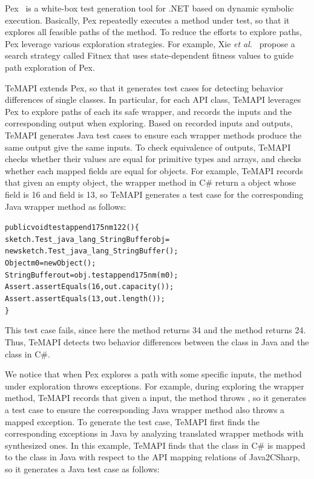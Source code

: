 Pex~\cite{tillmann2008pex} is a white-box test generation tool for .NET based on dynamic symbolic execution. Basically, Pex repeatedly executes a method under test, so that it explores all feasible paths of the method. To reduce the efforts to explore paths, Pex leverage various exploration strategies. For example, Xie \emph{et al.}~\cite{xie09:fitness} propose a search strategy called Fitnex that uses state-dependent fitness values to guide path exploration of Pex.

TeMAPI extends Pex, so that it generates test cases for detecting behavior differences of single classes. In particular, for each API class, TeMAPI leverages Pex to explore paths of each its safe wrapper, and records the inputs and the corresponding output when exploring. Based on recorded inputs and outputs, TeMAPI generates Java test cases to ensure each wrapper methods produce the same output give the same inputs. To check equivalence of  outputs, TeMAPI checks whether their values are equal for primitive types and arrays, and checks whether each mapped fields are equal for objects. For example, TeMAPI records that given an empty object, the  wrapper method in C\# return a  object whose  field is 16 and  field is 13, so TeMAPI generates a test case for the corresponding Java wrapper method as follows:

\begin{CodeOut}\vspace*{-1ex}
\begin{alltt}
public void testappend175nm122()\{
  sketch.Test_java_lang_StringBuffer obj =
      new sketch.Test_java_lang_StringBuffer();
  Object m0 = new Object();
  StringBuffer out = obj.testappend175nm(m0);
  Assert.assertEquals(16, out.capacity());	
  Assert.assertEquals(13, out.length());
\}
\end{alltt}
\end{CodeOut}\vspace*{-2ex}

This test case fails, since here the  method returns 34 and the  method returns 24. Thus, TeMAPI detects two behavior differences between the  class in Java and the  class in C\#.


We notice that when Pex explores a path with some specific inputs, the method under exploration throws exceptions.
For example, during exploring the  wrapper method, TeMAPI records that given a  input, the method throws , so it generates a test case to ensure the corresponding Java wrapper method also throws a mapped exception. To generate the test case, TeMAPI first finds the corresponding exceptions in Java by analyzing translated wrapper methods with synthesized ones. In this example, TeMAPI finds that the  class in C\# is mapped to the  class in Java with respect to the API mapping relations of Java2CSharp, so it generates a Java test case as follows:

